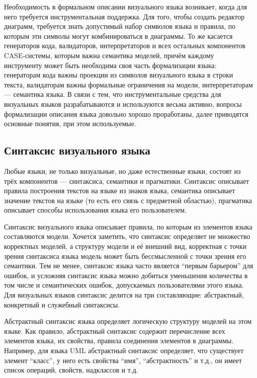 Необходимость в формальном описании визуального языка возникает, когда для него 
требуется инструментальная поддержка. Для того, чтобы создать редактор диаграмм, 
требуется знать допустимый набор символов языка и правила, по которым эти 
символы могут комбинироваться в диаграммы. То же касается генераторов кода, 
валидаторов, интерпретаторов и всех остальных компонентов CASE-системы, которым 
важна семантика моделей, причём каждому инструменту может быть необходима своя 
часть формализации языка: генераторам кода важны проекции из символов 
визуального языка в строки текста, валидаторам важны формальные ограничения на 
модели, интерпретаторам --- семантика языка. В связи с тем, что инструментальные 
средства для визуальных языков разрабатываются и используются весьма активно, 
вопросы формализации описания языка довольно хорошо проработаны, далее 
приводятся основные понятия, при этом используемые.

\subsection{Синтаксис визуального языка}
Любые языки, не только визуальные, но даже естественные языки, состоят из трёх 
компонентов --- синтаксиса, семантики и прагматики. Синтаксис описывает правила 
построения текстов на языке из знаков языка, семантика описывает значение 
текстов на языке (то есть его связь с предметной областью), прагматика описывает 
способы использования языка его пользователем.

Синтаксис визуального языка описывает правила, по которым из элементов языка 
составляются модели. Хочется заметить, что синтаксис определяет не множество 
корректных моделей, а структуру модели и её внешний вид, корректная с точки 
зрения синтаксиса языка модель может быть бессмысленной с точки зрения его 
семантики. Тем не менее, синтаксис языка часто является "`первым барьером"' для 
ошибок, и усложняя синтаксис языка можно добиться уменьшения количества в том 
числе и семантических ошибок, допускаемых пользователями этого языка. Для 
визуальных языков синтаксис делится на три составляющие: абстрактный, 
конкретный и служебный синтаксисы.

Абстрактный синтаксис языка определяет логическую структуру моделей на этом 
языке. Как правило, абстрактный синтаксис содержит перечисление всех элементов 
языка, их свойства, правила соединения элементов в диаграммы. Например, для 
языка UML абстрактный синтаксис определяет, что существует элемент "`класс"', 
у него есть свойства "`имя"', "`абстрактность"' и т.д., он имеет список 
операций, свойств, надклассов и т.д.

